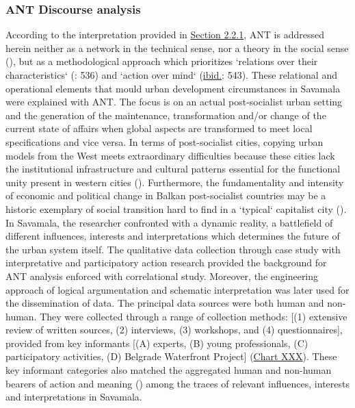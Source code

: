 \documentclass[11pt]{report}
\begin{document}
\subsubsection{ANT Discourse analysis}

According to the interpretation provided in \href{Section 2.2.1}{Section 2.2.1}, ANT is addressed herein neither as a network in the technical sense, nor a theory in the social sense (\href{Latour}{\citealt{latour_actor-network_1996}}), but as a methodological approach which prioritizes  `relations over their characteristics` (\href{Cerulo}{\citealt{cerulo_nonhumans_2009}}: 536) and `action over mind` (\href{Cerulo}{ibid.}: 543). These relational and operational elements that mould urban development circumstances in Savamala were explained with ANT. The focus is on an actual post-socialist urban setting and the generation of the maintenance, transformation and/or change of the current state of affairs when global aspects are transformed to meet local specifications and vice versa. In terms of post-socialist cities, copying urban models from the West meets extraordinary difficulties because these cities lack the institutional infrastructure and cultural patterns essential  for  the  functional  unity  present  in  western cities (\href{Petrovic}{\citealt{petrovic_cities_2009}}). Furthermore, the fundamentality and intensity of economic and political change in Balkan post-socialist countries may be a historic exemplary of social transition hard to find in a ‘typical‘ capitalist city (\href{Sykora}{\citealt{sykora_transitional_1999}}).
\\

In Savamala, the researcher confronted with a dynamic reality, a battlefield of different influences, interests and interpretations which determines the future of the urban system itself. The qualitative data collection through case study with interpretative and participatory action research provided the background for ANT analysis enforced with correlational study. Moreover, the engineering approach of logical argumentation and schematic interpretation was later used for the dissemination of data. The principal data sources were both human and non-human. They were collected through a range of collection methods: [(1) extensive review of written sources, (2) interviews, (3) workshops, and (4) questionnaires], provided from key informants [(A) experts, (B) young professionals, (C) participatory activities, (D) Belgrade Waterfront Project] (\href{Table data sources}{Chart XXX}). These key informant categories also matched the aggregated human and non-human bearers of action and meaning (\href{Latour}\cite{Latour 2005}) among the traces of relevant influences, interests and interpretations in Savamala.
\\
\end{document}

